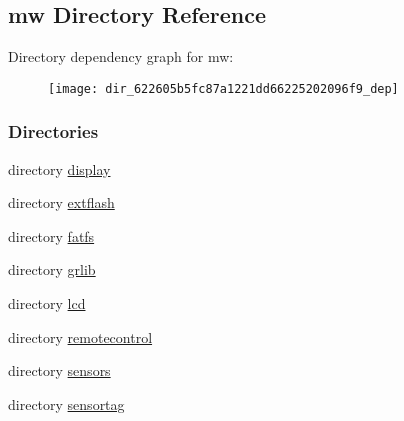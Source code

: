\subsection{mw Directory Reference}
\label{dir_622605b5fc87a1221dd66225202096f9}
Directory dependency graph for mw\+:
\nopagebreak
\begin{figure}[H]
\begin{center}
\leavevmode
\texttt{[image: dir\_622605b5fc87a1221dd66225202096f9\_dep]}
\end{center}
\end{figure}
\subsubsection*{Directories}
\begin{DoxyCompactItemize}
\item 
directory \hyperlink{dir_5191fdcfa732a7ed0729ace242509823}{display}
\item 
directory \hyperlink{dir_62e5cdccb1cca3becbf91c4cd3d25bed}{extflash}
\item 
directory \hyperlink{dir_09d4129dbd80ab548de29346088bdb41}{fatfs}
\item 
directory \hyperlink{dir_7972e94804c51ae0e5852cfbdc28c51f}{grlib}
\item 
directory \hyperlink{dir_5299304ede3f99abaf860c498e8d2dfa}{lcd}
\item 
directory \hyperlink{dir_47eed84410cd61cca0901743a2bfe24d}{remotecontrol}
\item 
directory \hyperlink{dir_df123555319038bcf9f919c48d80be61}{sensors}
\item 
directory \hyperlink{dir_ba2586adace564832564ffa74c3bc6af}{sensortag}
\end{DoxyCompactItemize}
